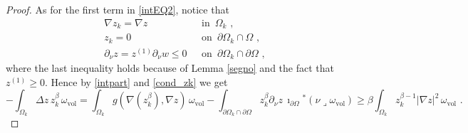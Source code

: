 \documentclass[10pt, a4paper, reqno, oneside]{amsart}
\theoremstyle{plain}
\theoremstyle{definition}
\theoremstyle{plain}
\theoremstyle{definition}
\theoremstyle{plain}
\renewcommand{\=}{:=}
\begin{document}
\begin{proof}
As for the first term in \eqref{intEQ2}, notice that
\begin{equation} \label{cond_zk}
\begin{array}{rl}
\nabla z_k = \nabla z \,\,& \text{ in }\, \Omega_k \,\, , \\
z_k = 0 \,\,& \text{ on }\, \partial\Omega_k\cap \Omega \,\, , \\
\partial_{\nu}z = z^{(1)}\partial_{\nu}w \leq 0 \,\,& \text{ on }\, \partial\Omega_k\cap \partial \Omega \,\, ,
\end{array}
\end{equation}
where the last inequality holds because of Lemma \ref{segno} and the fact that $z^{(1)}\geq0$. Hence by \eqref{intpart} and \eqref{cond_zk} we get
\begin{equation} \label{intEQ2(1)}
-\int_{\Omega_k} \Delta z \, z_k^{\beta} \, \omega_{\mathrm{vol}} =
\int_{\Omega_k} g(\nabla (z_k^{\beta}), \nabla z) \, \omega_{\mathrm{vol}}
-\int_{\partial \Omega_k \cap \partial \Omega}z_k^\beta \partial_\nu z \, \imath_{\partial\Omega}{}^*(\nu \lrcorner \omega_{\mathrm{vol}})
\geq \beta \int_{\Omega_k}z_k^{\beta-1}|\nabla z|^2\, \omega_{\mathrm{vol}} \,\, .
\end{equation}


\end{proof}
\end{document}
